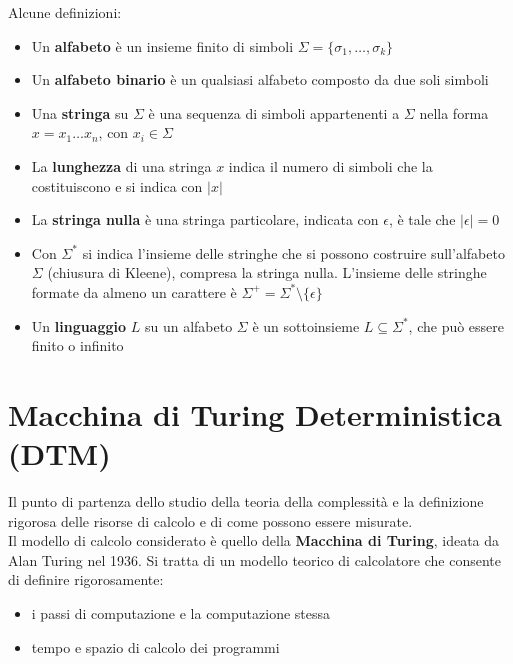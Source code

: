 Alcune definizioni:
\begin{itemize}
	\item Un \textbf{alfabeto} è un insieme finito di simboli $\Sigma = \{\sigma_1, \dots, \sigma_k\}$
	\item Un \textbf{alfabeto binario} è un qualsiasi alfabeto composto da due soli simboli
	\item Una \textbf{stringa} su $\Sigma$ è una sequenza di simboli appartenenti a $\Sigma$ nella forma $x = x_1 \dots x_n$, con $x_i \in \Sigma$
	\item La \textbf{lunghezza} di una stringa $x$ indica il numero di simboli che la costituiscono e si indica con $|x|$
	\item La \textbf{stringa nulla} è una stringa particolare, indicata con $\epsilon$, è tale che $|\epsilon| = 0$
	\item Con $\Sigma^\ast$ si indica l'insieme delle stringhe che si possono costruire sull'alfabeto $\Sigma$ (chiusura di Kleene), compresa la stringa nulla. L'insieme delle stringhe formate da almeno un carattere è $\Sigma^+ = \Sigma^\ast \setminus \{\epsilon\}$
	\item Un \textbf{linguaggio} $L$ su un alfabeto $\Sigma$ è un sottoinsieme $L \subseteq \Sigma^\ast$, che può essere finito o infinito
\end{itemize}

\section{Macchina di Turing Deterministica (DTM)}
Il punto di partenza dello studio della teoria della complessità e la definizione rigorosa delle risorse di calcolo e di come possono essere misurate.\\

Il modello di calcolo considerato è quello della \textbf{Macchina di Turing}, ideata da Alan Turing nel 1936. Si tratta di un modello teorico di calcolatore che consente di definire rigorosamente: 
\begin{itemize}
	\item i passi di computazione e la computazione stessa
	\item tempo e spazio di calcolo dei programmi
\end{itemize}

